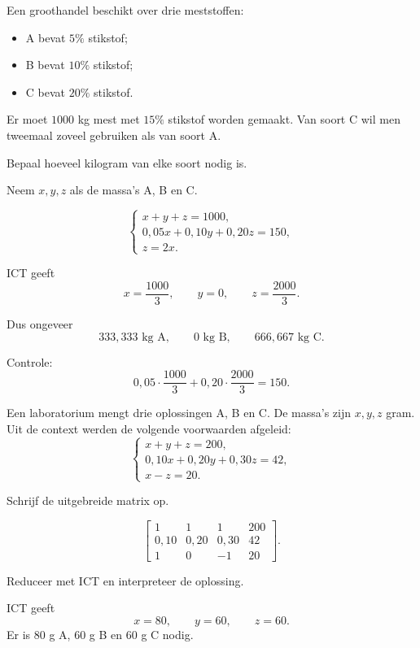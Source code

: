 \documentclass{ximera}
\begin{document}
\begin{oefening}{\oefB\ESS}

Een groothandel beschikt over drie meststoffen:

\begin{itemize}
  \item A bevat \(5\%\) stikstof;
  \item B bevat \(10\%\) stikstof;
  \item C bevat \(20\%\) stikstof.
\end{itemize}

Er moet \(1000\) kg mest met \(15\%\) stikstof worden gemaakt.
Van soort C wil men tweemaal zoveel gebruiken als van soort A.

Bepaal hoeveel kilogram van elke soort nodig is.

\begin{oplossing}
Neem \(x,y,z\) als de massa's A, B en C.

\[
\begin{cases}
x+y+z=1000,\\
0{,}05x+0{,}10y+0{,}20z=150,\\
z=2x.
\end{cases}
\]

ICT geeft
\[
x=\frac{1000}{3},\qquad y=0,\qquad z=\frac{2000}{3}.
\]

Dus ongeveer
\[
333{,}333\text{ kg A},\qquad
0\text{ kg B},\qquad
666{,}667\text{ kg C}.
\]

Controle:
\[
0{,}05\cdot\frac{1000}{3}
+
0{,}20\cdot\frac{2000}{3}
=150.
\]
\end{oplossing}
\end{oefening}


\begin{oefening}{\oefB\ESS}

Een laboratorium mengt drie oplossingen A, B en C. De massa's zijn
\(x,y,z\) gram. Uit de context werden de volgende voorwaarden afgeleid:
\[
\begin{cases}
x+y+z=200,\\
0{,}10x+0{,}20y+0{,}30z=42,\\
x-z=20.
\end{cases}
\]

\begin{question}
Schrijf de uitgebreide matrix op.
\begin{oplossing}
\[
\left[
\begin{array}{ccc|c}
1&1&1&200\\
0{,}10&0{,}20&0{,}30&42\\
1&0&-1&20
\end{array}
\right].
\]
\end{oplossing}
\end{question}

\begin{question}
Reduceer met ICT en interpreteer de oplossing.
\begin{oplossing}
ICT geeft
\[
x=80,\qquad y=60,\qquad z=60.
\]
Er is \(80\) g A, \(60\) g B en \(60\) g C nodig.
\end{oplossing}
\end{question}
\end{oefening}
\end{document}
